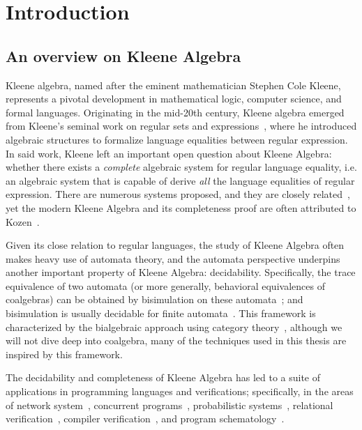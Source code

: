 \chapter{Introduction}
\label{chapter:introduction}
\thispagestyle{myheadings}

\section{An overview on Kleene Algebra}
\label{sec:history}

Kleene algebra, named after the eminent mathematician Stephen Cole Kleene, represents a pivotal development in mathematical logic, computer science, and formal languages. 
Originating in the mid-20th century, Kleene algebra emerged from Kleene's seminal work on regular sets and expressions~\cite{Kleene_1956}, where he introduced algebraic structures to formalize language equalities between regular expression. 
In said work, Kleene left an important open question about Kleene Algebra: whether there exists a \emph{complete} algebraic system for regular language equality, i.e. an algebraic system that is capable of derive \emph{all} the language equalities of regular expression.
There are numerous systems proposed, and they are closely related~\cite{Kozen_1990}, yet the modern Kleene Algebra and its completeness proof are often attributed to Kozen~\cite{Kozen_2001,Kozen_1994}.

Given its close relation to regular languages, the study of Kleene Algebra often makes heavy use of automata theory,
and the automata perspective underpins another important property of Kleene Algebra: decidability.
Specifically, the trace equivalence of two automata (or more generally, behavioral equivalences of coalgebras) can be obtained by bisimulation on these automata~\cite{rutten_UniversalCoalgebraTheory_2000}; and bisimulation is usually decidable for finite automata~\cite{Kozen_2008,Smolka_Foster_Hsu_Kappé_Kozen_Silva_2020,Silva_2010}.
This framework is characterized by the bialgebraic approach using category theory~\cite{jacobs_BialgebraicReviewDeterministic_2006}, although we will not dive deep into coalgebra, many of the techniques used in this thesis are inspired by this framework.

The decidability and completeness of Kleene Algebra has led to a suite of applications in programming languages and verifications; specifically, in the areas of network system~\cite{Anderson_Foster_Guha_Jeannin_Kozen_Schlesinger_Walker_2014,Foster_Kozen_Milano_Silva_Thompson_2015, Smolka_Kumar_Kahn_Foster_Hsu_Kozen_Silva_2019},
concurrent programs~\cite{hoare_ConcurrentKleeneAlgebra_2009,Kappé_Brunet_Silva_Wagemaker_Zanasi_2020,Kappé_Brunet_Silva_Zanasi_2018}, 
probabilistic systems~\cite{mciver_UsingProbabilisticKleene_2006, McIver_Rabehaja_Struth_2011}, 
relational verification~\cite{Antonopoulos_Koskinen_Le_Nagasamudram_Naumann_Ngo_2022},
compiler verification~\cite{Kozen_Patron_2000},
and program schematology~\cite{Angus_Kozen_2001}.


